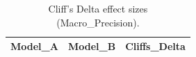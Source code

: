 \begin{table}[t]
\centering
\begin{tabular}{lll}
\toprule
Model_A & Model_B & Cliffs_Delta \\
\midrule
\bottomrule
\end{tabular}
\caption{Cliff's Delta effect sizes (Macro_Precision).}
\label{tab:cliffs_Macro_Precision}
\end{table}